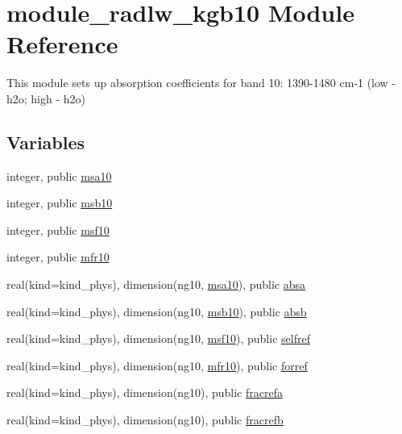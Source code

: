 \hypertarget{namespacemodule__radlw__kgb10}{}\section{module\+\_\+radlw\+\_\+kgb10 Module Reference}
\label{namespacemodule__radlw__kgb10}


This module sets up absorption coefficients for band 10\+: 1390-\/1480 cm-\/1 (low -\/ h2o; high -\/ h2o)  


\subsection*{Variables}
\begin{DoxyCompactItemize}
\item 
integer, public \hyperlink{namespacemodule__radlw__kgb10_a2305b922082d1cc367276b636f09fb6c}{msa10}
\item 
integer, public \hyperlink{namespacemodule__radlw__kgb10_af33570d793ca152588c14ce30ac30798}{msb10}
\item 
integer, public \hyperlink{namespacemodule__radlw__kgb10_a1b69c6fe99ed4ebc7b3d78b8f842b880}{msf10}
\item 
integer, public \hyperlink{namespacemodule__radlw__kgb10_a0f3944c4b86044e0c5db3dc351226c88}{mfr10}
\item 
real(kind=kind\+\_\+phys), dimension(ng10, \hyperlink{namespacemodule__radlw__kgb10_a2305b922082d1cc367276b636f09fb6c}{msa10}), public \hyperlink{namespacemodule__radlw__kgb10_a14f18538f77c1a3d651e36acf90baa19}{absa}
\item 
real(kind=kind\+\_\+phys), dimension(ng10, \hyperlink{namespacemodule__radlw__kgb10_af33570d793ca152588c14ce30ac30798}{msb10}), public \hyperlink{namespacemodule__radlw__kgb10_af1e2252355a3002080be21ce37d45c3a}{absb}
\item 
real(kind=kind\+\_\+phys), dimension(ng10, \hyperlink{namespacemodule__radlw__kgb10_a1b69c6fe99ed4ebc7b3d78b8f842b880}{msf10}), public \hyperlink{namespacemodule__radlw__kgb10_a48247dea283a611ebe57dd1c164dda69}{selfref}
\item 
real(kind=kind\+\_\+phys), dimension(ng10, \hyperlink{namespacemodule__radlw__kgb10_a0f3944c4b86044e0c5db3dc351226c88}{mfr10}), public \hyperlink{namespacemodule__radlw__kgb10_af70e39048d571053790289549dd8333a}{forref}
\item 
real(kind=kind\+\_\+phys), dimension(ng10), public \hyperlink{namespacemodule__radlw__kgb10_aa8bbfdaf370e12ae26d2ee3c464bdbc2}{fracrefa}
\item 
real(kind=kind\+\_\+phys), dimension(ng10), public \hyperlink{namespacemodule__radlw__kgb10_a07d5bac00d30f1ab873a0542b28d7e83}{fracrefb}
\end{DoxyCompactItemize}


